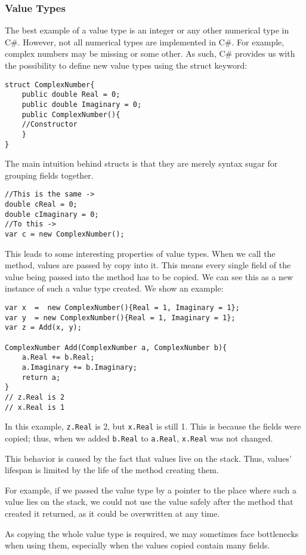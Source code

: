 \subsubsection{Value Types}
The best example of a value type is an integer or any other numerical type in C\#. However, not all numerical types are implemented in C\#. For example, complex numbers may be missing or some other. As such, C\# provides us with the possibility to define new value types using the struct keyword:
\begin{lstlisting}
struct ComplexNumber{
    public double Real = 0;
    public double Imaginary = 0;
    public ComplexNumber(){ 
    //Constructor
    }
}
\end{lstlisting}
The main intuition behind structs is that they are merely syntax sugar for grouping fields together. 
\begin{lstlisting}
//This is the same ->
double cReal = 0;
double cImaginary = 0;
//To this ->
var c = new ComplexNumber();
\end{lstlisting}
This leads to some interesting properties of value types.
When we call the method, values are passed by copy into it. This means every single field of the value being passed into the method has to be copied. We can see this as a new instance of such a value type created. We show an example:
\begin{lstlisting}
var x  =  new ComplexNumber(){Real = 1, Imaginary = 1};
var y  = new ComplexNumber(){Real = 1, Imaginary = 1};
var z = Add(x, y);

ComplexNumber Add(ComplexNumber a, ComplexNumber b){
    a.Real += b.Real;
    a.Imaginary += b.Imaginary;
    return a;
}
// z.Real is 2
// x.Real is 1
\end{lstlisting}
In this example, \texttt{z.Real} is 2, but \texttt{x.Real} is still 1. This is because the fields were copied; thus, when we added \texttt{b.Real} to \texttt{a.Real}, \texttt{x.Real} was not changed.

This behavior is caused by the fact that values live on the stack. Thus, values' lifespan is limited by the life of the method creating them. 

For example, if we passed the value type by a pointer to the place where such a value lies on the stack, we could not use the value safely after the method that created it returned, as it could be overwritten at any time.

As copying the whole value type is required, we may sometimes face bottlenecks when using them, especially when the values copied contain many fields.

